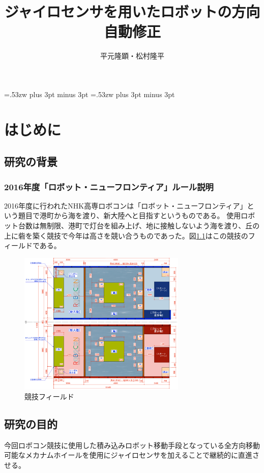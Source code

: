 \documentclass[12pt,oneside]{sotsuken_paper}
\title{ジャイロセンサを用いたロボットの方向自動修正}
\author{平元隆顕・松村隆平}
\begin{document}
\setlength{\baselineskip}{9truemm}

\kanjiskip=.53zw plus 3pt minus 3pt
\xkanjiskip=.53zw plus 3pt minus 3pt

\tableofcontents


\chapter{はじめに}

	\section{研究の背景}

		\subsection{2016年度「ロボット・ニューフロンティア」ルール説明}
		2016年度に行われたNHK高専ロボコンは「ロボット・ニューフロンティア」という題目で港町から海を渡り、新大陸へと目指すというものである。
		使用ロボット台数は無制限、港町で灯台を組み上げ、地に接触しないよう海を渡り、丘の上に砦を築く競技で今年は高さを競い合うものであった。図\ref{競技フィールド}はこの競技のフィールドである。


		\begin{figure}[htp]
			\begin{center}
				\includegraphics[width=80mm]{Image/フィールド.png}
				\caption{競技フィールド}
				\label{競技フィールド}
			\end{center}
		\end{figure}

	\section{研究の目的}
	今回ロボコン競技に使用した積み込みロボット移動手段となっている全方向移動可能なメカナムホイールを使用にジャイロセンサを加えることで継続的に直進させる。
\end{document}
